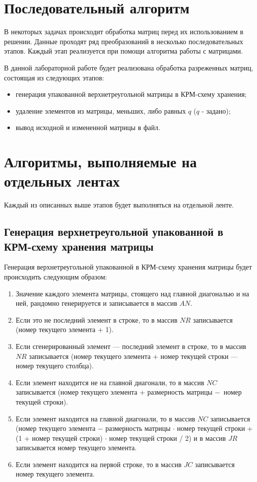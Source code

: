 \section{Последовательный алгоритм}

В некоторых задачах происходит обработка матриц перед
их использованием в решении. Данные проходят ряд преобразований в
несколько последовательных этапов. Каждый этап реализуется при помощи алгоритма работы с матрицами.

В данной лабораторной работе будет реализована обработка разреженных матриц, состоящая из следующих этапов:
\begin{itemize}
	\item генерация упакованной верхнетреугольной матрицы в КРМ-схему хранения;
	\item удаление элементов из матрицы, меньших, либо равных $q$ ($q$ - задано);
	\item вывод исходной и измененной матрицы в файл.
\end{itemize}

\section{Алгоритмы, выполняемые на отдельных лентах}

Каждый из описанных выше этапов будет выполняться на отдельной ленте.

\subsection{Генерация верхнетреугольной упакованной в КРМ-схему хранения матрицы}

Генерация верхнетреугольной упакованной в КРМ-схему хранения матрицы будет происходить следующим образом:
\begin{enumerate}
	\item Значение каждого элемента матрицы, стоящего над главной диагональю и на ней, рандомно генерируется и записывается в массив $AN$.
	\item Если это не последний элемент в строке, то в массив $NR$ записывается (номер текущего элемента + 1).
	\item Если сгенерированный элемент --- последний элемент в строке, то в массив $NR$ записывается (номер текущего элемента + номер текущей строки --- номер текущего столбца).
	\item Если элемент находится не на главной диагонали, то в массив $NC$ записывается (номер текущего элемента + размерность матрицы $-$~номер текущей строки).
	\item Если элемент находится на главной диагонали, то в массив $NC$ записывается (номер текущего элемента $-$ размерность матрицы $\cdot$ номер текущей строки + (1 + номер текущей строки) $\cdot$ номер текущей строки / 2) и в массив $JR$ записывается номер текущего элемента.
	\item Если элемент находится на первой строке, то в массив $JC$ записывается номер текущего элемента.
\end{enumerate}


